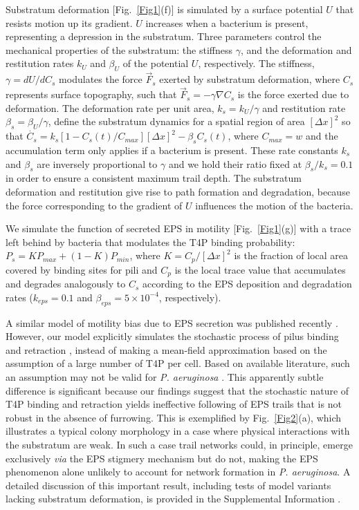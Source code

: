 \documentclass[aps,prl,numerical,reprint,superscriptaddress,showpacs]{revtex4-1}
\begin{document}
Substratum deformation [Fig.~\ref{Fig1}(f)] is simulated by a surface potential $U$ that resists motion up its gradient. $U$ increases when a bacterium is present, representing a depression in the substratum. Three parameters control the mechanical properties of the substratum: the stiffness $\gamma$, and the deformation and restitution rates $k_U$ and $\beta_U$ of the potential $U$, respectively. The stiffness, $\gamma = dU/dC_s$ modulates the force $\vec{F}_{s}$ exerted by substratum deformation, where $C_s$ represents surface topography, such that $\vec{F}_{s} = -\gamma \nabla C_{s} $ is the force exerted due to deformation. The deformation rate per unit area, $k_s = k_U/\gamma$ and restitution rate $\beta_s = \beta_U/\gamma$, define the substratum dynamics for a spatial region of area $[\Delta x] ^2$ so that $\dot{C_s} = k_s[1 - C_s(t)/C_{max}][\Delta x] ^2 - \beta_s C_s(t)$, where $C_{max} = w$ and the accumulation term only applies if a bacterium is present. These rate constants $k_s$ and $\beta_s$ are inversely proportional to $\gamma$ and we hold their ratio fixed at $\beta_s / k_s = 0.1$ in order to ensure a consistent maximum trail depth. The substratum deformation and restitution give rise to path formation and degradation, because the force corresponding to the gradient of $U$ influences the motion of the bacteria. 

We simulate the function of secreted EPS in motility [Fig.~\ref{Fig1}(g)] with a trace left behind by bacteria that modulates the T4P binding probability: $P_s = KP_{max} + (1 - K)P_{min}$, where $K = C_p/[\Delta x]^2$ is the fraction of local area covered by binding sites for pili and $C_p$ is the local trace value that accumulates and degrades analogously to $C_s$ according to the EPS deposition and degradation rates ($k_{eps} = 0.1$ and  $\beta_{eps} = 5 \times 10^{-4}$, respectively).

A similar model of motility bias due to EPS secretion was published recently \cite{Gelimson2016Multicellular,kranz2016trails}. However, our model explicitly simulates the stochastic process of pilus binding and retraction \cite{zachreson2016emergent}, instead of making a mean-field approximation based on the assumption of a large number of T4P per cell. Based on available literature, such an assumption may not be valid for {\it{P. aeruginosa}} \cite{skerker2001direct}. This apparently subtle difference is significant because our findings suggest that the stochastic nature of T4P binding and retraction yields ineffective following of EPS trails that is not robust in the absence of furrowing. This is exemplified by Fig.~\ref{Fig2}(a), which illustrates a typical colony morphology in a case where physical interactions with the substratum are weak. In such a case trail networks could, in principle, emerge exclusively {\it{via}} the EPS stigmery mechanism but do not, making the EPS phenomenon alone unlikely to account for network formation in {\it P. aeruginosa}. A detailed discussion of this important result, including tests of model variants lacking substratum deformation, is provided in the Supplemental Information \cite{Supp}.
\end{document}
